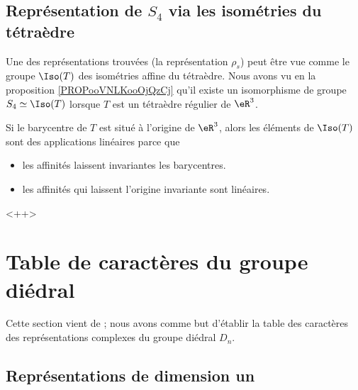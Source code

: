 \subsection{Représentation de \( S_4\) via les isométries du tétraèdre}
\label{SUBSECooLEUAooGGjGIZ}

Une des représentations trouvées (la représentation \( \rho_s\)) peut être vue comme le groupe \( \Iso(T)\) des isométries affine du tétraèdre. Nous avons vu en la proposition \ref{PROPooVNLKooOjQzCj} qu'il existe un isomorphisme de groupe \( S_4\simeq \Iso(T)\) lorsque \( T\) est un tétraèdre régulier de \( \eR^3\).

Si le barycentre de \( T\) est situé à l'origine de \( \eR^3\), alors les éléments de \( \Iso(T)\) sont des applications linéaires parce que
\begin{itemize}
    \item les affinités laissent invariantes les barycentres.
    \item les affinités qui laissent l'origine invariante sont linéaires.
\end{itemize}
<++>


\section{Table de caractères du groupe diédral}
\label{SecWMzheKf}
Cette section vient de \cite{KXjFWKA}; nous avons comme but d'établir la table des caractères des représentations complexes du groupe diédral \( D_n\).

\subsection{Représentations de dimension un}

